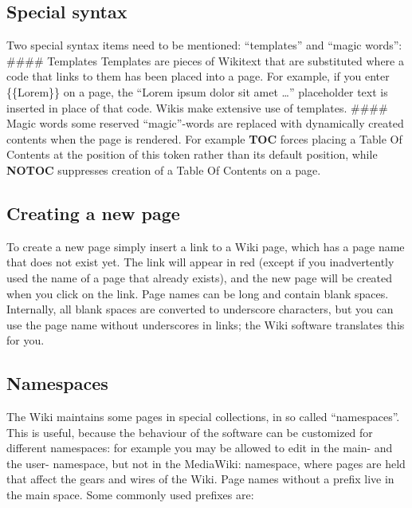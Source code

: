 \documentclass[]{book}
\begin{document}
\subsection{Special syntax}\label{special-syntax}

Two special syntax items need to be mentioned: ``templates'' and ``magic
words'': \#\#\#\# Templates Templates are pieces of Wikitext that are
substituted where a code that links to them has been placed into a page.
For example, if you enter \{\{Lorem\}\} on a page, the ``Lorem ipsum
dolor sit amet \ldots{}'' placeholder text is inserted in place of that
code. Wikis make extensive use of templates. \#\#\#\# Magic words some
reserved ``magic''-words are replaced with dynamically created contents
when the page is rendered. For example \textbf{TOC} forces placing a
Table Of Contents at the position of this token rather than its default
position, while \textbf{NOTOC} suppresses creation of a Table Of
Contents on a page.

\subsection{Creating a new page}\label{creating-a-new-page}

To create a new page simply insert a link to a Wiki page, which has a
page name that does not exist yet. The link will appear in red (except
if you inadvertently used the name of a page that already exists), and
the new page will be created when you click on the link. Page names can
be long and contain blank spaces. Internally, all blank spaces are
converted to underscore characters, but you can use the page name
without underscores in links; the Wiki software translates this for you.

\subsection{Namespaces}\label{namespaces}

The Wiki maintains some pages in special collections, in so called
``namespaces''. This is useful, because the behaviour of the software
can be customized for different namespaces: for example you may be
allowed to edit in the main- and the user- namespace, but not in the
MediaWiki: namespace, where pages are held that affect the gears and
wires of the Wiki. Page names without a prefix live in the main space.
Some commonly used prefixes are:
\end{document}
